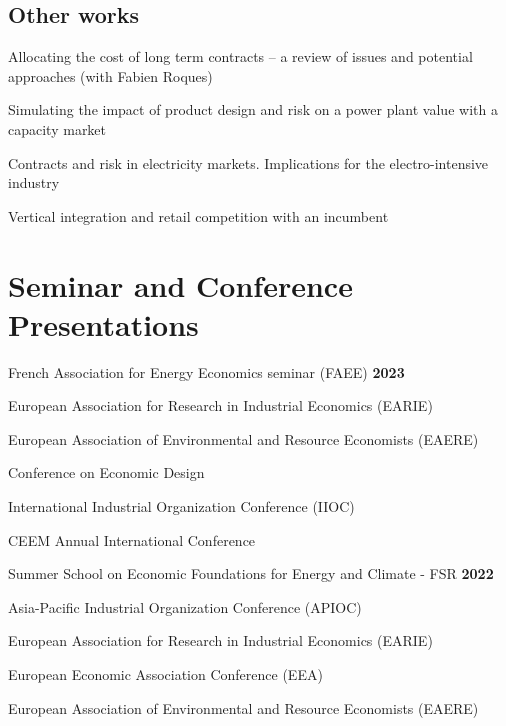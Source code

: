 \documentclass[letterpaper]{article}
\renewenvironment{itemize}{
  \begin{list}{}{
    \setlength{\leftmargin}{1.5em}
  }
}{
  \end{list}
}
\begin{document}
\subsection*{Other works}

\begin{itemize}
\item Allocating the cost of long term contracts – a review of issues and potential approaches (with Fabien Roques)
\item Simulating the impact of product design and risk on a power plant value with a capacity market
\item Contracts and risk in electricity markets. Implications for the electro-intensive industry
\item Vertical integration and retail competition with an incumbent
\end{itemize}


\section*{\textbf{Seminar and Conference Presentations}}
 
 \vspace{0.5\baselineskip}



French Association for Energy Economics seminar (FAEE) \hfill \hfill \textbf{2023}



European Association for Research in Industrial Economics (EARIE)

European Association of Environmental and Resource Economists (EAERE)

Conference on Economic Design

International Industrial Organization Conference (IIOC)

CEEM Annual International Conference


\vspace{0.5cm}

Summer School on Economic Foundations for Energy and Climate - FSR \hfill \hfill  \textbf{2022}

Asia-Pacific Industrial Organization Conference (APIOC)

European Association for Research in Industrial Economics (EARIE)

European Economic Association Conference (EEA)

European Association of Environmental and Resource Economists (EAERE)

\vspace{0.5cm}
\end{document}
